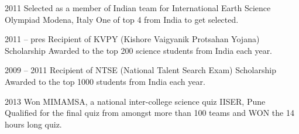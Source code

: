 \documentclass[11pt]{friggeri-cv}%
\begin{document}
\begin{entrylist}
  \entryy
    {2011}
    {Selected as a member of Indian team for International Earth Science Olympiad}
    {Modena, Italy}
    {One of top 4 from India to get selected.}
\end{entrylist}
\begin{entrylist}
  \entryy
    {2011 -- pres}
    {Recipient of KVPY (Kishore Vaigyanik Protsahan Yojana) Scholarship}{}
    {Awarded to the top 200 science students from India each year.}

\end{entrylist}
\begin{entrylist}
  \entryy
    {2009 -- 2011}
    {Recipient of NTSE (National Talent Search Exam) Scholarship}{}
    {Awarded to the top 1000 students from India each year.}
\end{entrylist}
\begin{entrylist}
  \entryy
    {2013}
    {Won MIMAMSA, a national inter-college science quiz}
    {IISER, Pune}
    {Qualified for the final quiz from amongst more than 100 teams and WON the 14 hours long quiz.}
\end{entrylist}
\end{document}
